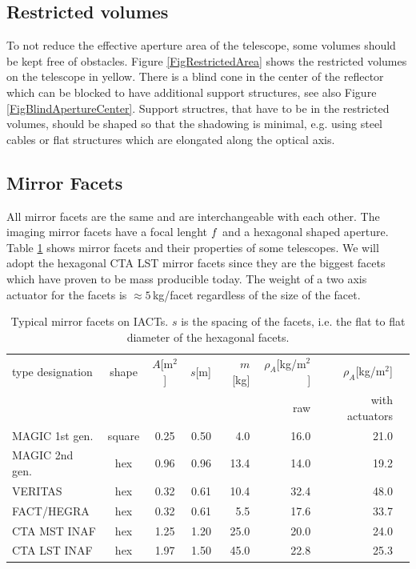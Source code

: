 \documentclass[11pt,a4paper,oneside,titlepage]{article}
\begin{document}
\subsection{Restricted volumes}
%
To not reduce the effective aperture area of the telescope, some volumes should be kept free of obstacles.
%
Figure \ref{FigRestrictedArea} shows the restricted volumes on the telescope in yellow.
%
There is a blind cone in the center of the reflector which can be blocked to have additional support structures, see also Figure \ref{FigBlindApertureCenter}.
%
Support structres, that have to be in the restricted volumes, should be shaped so that the shadowing is minimal, e.g. using steel cables or flat structures which are elongated along the optical axis.
%
%
\subsection{Mirror Facets}
%
All mirror facets are the same and are interchangeable with each other.
%
The imaging mirror facets have a focal lenght $f$ and a hexagonal shaped aperture.
%
Table \ref{TabFacets} shows mirror facets and their properties of some telescopes. 
%
We will adopt the hexagonal CTA LST mirror facets since they are the biggest facets which have proven to be mass producible today.
%
The weight of a two axis actuator for the facets is $\approx 5\,$kg/facet regardless of the size of the facet.
%
\begin{table}[H]
    \begin{center}
        \begin{tabular}{lccrrrrr}
            type designation & shape & $A$[m$^2$] & $s$[m] & $m$[kg] & $\rho_A$[kg/m$^2$] & $\rho_A$[kg/m$^2$]\\
             & & & & & raw & with actuators\\
            \toprule
            MAGIC 1st gen. & square & 0.25 & 0.50  & 4.0 & 16.0 & 21.0\\
            MAGIC 2nd gen. & hex    & 0.96 & 0.96 & 13.4 & 14.0 & 19.2\\
            VERITAS        & hex    & 0.32 & 0.61 & 10.4 & 32.4 & 48.0\\
            FACT/HEGRA     & hex    & 0.32 & 0.61 & 5.5 & 17.6 & 33.7\\
            CTA MST INAF   & hex    & 1.25 & 1.20 & 25.0 & 20.0 & 24.0\\
            CTA LST INAF   & hex    & 1.97 & 1.50 & 45.0 & 22.8 & 25.3\\
            \bottomrule
        \end{tabular}
        \caption[]{Typical mirror facets on IACTs. $s$ is the spacing of the facets, i.e. the flat to flat diameter of the hexagonal facets.}
        \label{TabFacets}
    \end{center}
\end{table}
%
\end{document}
